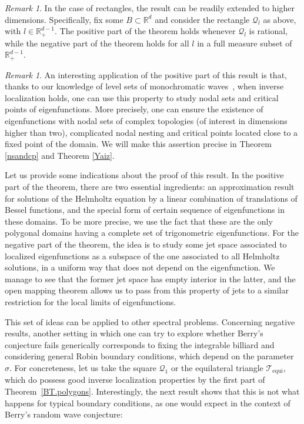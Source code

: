 \documentclass{amsart}
\theoremstyle{definition}
\theoremstyle{remark}
\newtheorem{remark}[theorem]{Remark}
\newcommand{\si}{\sigma}
\def\RR{\mathbb{R}}
\numberwithin{equation}{section}
\theoremstyle{definition}
\theoremstyle{remark}
\def\RR{\mathbb{R}}
\begin{document}
\begin{remark}\label{R.highdim}
	In the case of rectangles, the result can be readily extended to higher dimensions. Specifically, fix some $B\subset\RR^d$ and consider the rectangle $\mathcal Q_l$ as above, with $l\in\RR_+^{d-1}$. The positive part of the theorem holds whenever $\mathcal Q_l$ is rational, while the negative part of the theorem holds for all $l$ in a full measure subset of~$\RR_+^{d-1}$.
\end{remark}

\begin{remark}
	An interesting application of the positive part of this result is that, thanks to our knowledge of level sets of monochromatic waves~\cite{Adv13,Yaiza}, when inverse localization holds, one can use this property to study nodal sets and critical points of eigenfunctions. More precisely, one can ensure the existence of eigenfunctions with  nodal sets of complex topologies (of interest in dimensions higher than two), complicated nodal nesting and critical points located close to a fixed point of the domain. We will make this assertion precise in Theorem \ref{nsandcp} and Theorem \ref{Yaiz}.
	
\end{remark}
Let us provide some indications about the proof of this result. In the positive part of the theorem, there are two essential ingredients:  an approximation result for solutions of the Helmholtz equation by a linear combination of translations of Bessel functions, and the special form of certain sequence of eigenfunctions  in these domains. To be more precise, we use the fact that these are the only polygonal domains having a complete set of trigonometric eigenfunctions.  For the negative part of the theorem, the idea is to study some jet space associated to localized eigenfunctions as a subspace of the one associated to all Helmholtz solutions, in a uniform way that does not depend on the eigenfunction. We manage to see that the former jet space has empty interior in the latter, and the open mapping theorem allows us to pass from this property of jets to a similar restriction for the local limits of eigenfunctions.



This set of ideas can be applied to other spectral problems. Concerning negative results, another setting in which one can try to explore whether Berry's conjecture fails generically corresponds to fixing the integrable billiard and considering general Robin boundary conditions, which depend on the parameter~$\si$. For concreteness, let us take the square $\mathcal{Q}_1$ or the equilateral triangle $\mathcal{T}_{\mathrm{equi}}$, which do possess good inverse localization properties by the first part of Theorem~\ref{BT.polygons}. Interestingly, the next result shows that this is not what happens for typical boundary conditions, as one would expect in the context of Berry's random wave conjecture:
\end{document}
